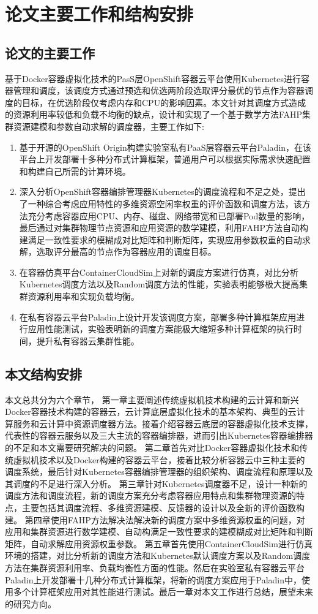 \section{论文主要工作和结构安排}
\subsection{论文的主要工作}
基于Docker容器虚拟化技术的PasS层OpenShift容器云平台使用Kubernetes进行容器管理和调度，该调度方式通过预选和优选两阶段选取评分最优的节点作为容器调度的目标，在优选阶段仅考虑内存和CPU的影响因素。本文针对其调度方式造成的资源利用率较低和负载不均衡的缺点，设计和实现了一个基于数学方法FAHP集群资源建模和参数自动求解的调度器，主要工作如下:
 \begin{enumerate}[(1)]
	\item 基于开源的OpenShift Origin构建实验室私有PaaS层容器云平台Paladin，在该平台上开发部署十多种分布式计算框架，普通用户可以根据实际需求快速配置和构建自己所需的计算环境。
	\item 深入分析OpenShift容器编排管理器Kubernetes的调度流程和不足之处，提出了一种综合考虑应用特性的多维资源空闲率权重的评价函数和调度方法，该方法充分考虑容器应用CPU、内存、磁盘、网络带宽和已部署Pod数量的影响，最后通过对集群物理节点资源和应用资源的数学建模，利用FAHP方法自动构建满足一致性要求的模糊成对比矩阵和判断矩阵，实现应用参数权重的自动求解，选取评分最高的节点作为容器应用的调度目标。
	\item 在容器仿真平台ContainerCloudSim上对新的调度方案进行仿真，对比分析Kubernetes调度方法以及Random调度方法的性能，实验表明能够极大提高集群资源利用率和实现负载均衡。
	\item 在私有容器云平台Paladin上设计开发该调度方案，部署多种计算框架应用进行应用性能测试，实验表明新的调度方案能极大缩短多种计算框架的执行时间，提升私有容器云集群性能。
\end{enumerate}

\subsection{本文结构安排}
本文总共分为六个章节，
第一章主要阐述传统虚拟机技术构建的云计算和新兴Docker容器技术构建的容器云，云计算底层虚拟化技术的基本架构、典型的云计算服务和云计算中资源调度器方法。接着介绍容器云底层的容器虚拟化技术支撑，代表性的容器云服务以及三大主流的容器编排器，进而引出Kubernetes容器编排器的不足和本文需要研究解决的问题。
第二章首先对比Docker容器虚拟化技术和传统虚拟机技术以及Docker构建的容器云平台，接着比较分析容器云中三种主要的调度系统，最后针对Kubernetes容器编排管理器的组织架构、调度流程和原理以及其调度的不足进行深入分析。
第三章针对Kubernetes调度器不足，设计一种新的调度方法和调度流程，新的调度方案充分考虑容器应用特点和集群物理资源的特点，主要包括其调度流程、多维资源建模、反馈器的设计以及全新的评价函数构建。
第四章使用FAHP方法解决法解决新的调度方案中多维资源权重的问题，对应用和集群资源进行数学建模、自动构满足一致性要求的建模糊成对比矩阵和判断矩阵，自动求解应用资源权重参数。
第五章首先使用ContainerCloudSim进行仿真环境的搭建，对比分析新的调度方法和Kubernetes默认调度方案以及Random调度方法在集群资源利用率、负载均衡性方面的性能。然后在实验室私有容器云平台Paladin上开发部署十几种分布式计算框架，将新的调度方案应用于Paladin中，使用多个计算框架应用对其性能进行测试。最后一章对本文工作进行总结，展望未来的研究方向。

